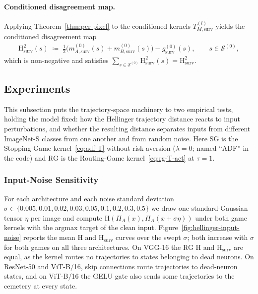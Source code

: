 \documentclass[twoside]{article}
\newcommand{\1}{\mathbf{1}}
\begin{document}
\paragraph{Conditioned disagreement map.}
Applying Theorem~\ref{thm:per-pixel} to the conditioned kernels $T_{M,\mathrm{surv}}^{(l)}$ yields
the conditioned disagreement map
\begin{align}\label{eq:conditioned-per-pixel-h2}
    \mathrm{H}_{\mathrm{surv}}^2(s)
    \;\coloneqq\;
    \tfrac{1}{2}\bigl(m_{A,\mathrm{surv}}^{(0)}(s) + m_{B,\mathrm{surv}}^{(0)}(s)\bigr)
    -
    g_{\mathrm{surv}}^{(0)}(s),
    \qquad s \in \mathcal{S}^{(0)},
\end{align}
which is non-negative and satisfies $\sum_{s \in \mathcal{S}^{(0)}} \mathrm{H}_{\mathrm{surv}}^2(s)
    = \mathrm{H}_{\mathrm{surv}}^2$.

\subsection{Experiments}\label{sec:lmp-experiments}

This subsection puts the trajectory-space machinery to two empirical tests, holding the model
fixed: how the Hellinger trajectory distance reacts to input perturbations, and whether the
resulting distance separates inputs from different ImageNet-S classes from one another and from
random noise. Here \ac{SG} is the Stopping-Game kernel~\eqref{eq:adf-T} without risk aversion
($\lambda = 0$; named ``ADF'' in the code) and \ac{RG} is the Routing-Game
kernel~\eqref{eq:rg-T-act} at $\tau = 1$.

\subsubsection{Input-Noise Sensitivity}\label{sec:input-noise-hellinger}

For each architecture and each noise standard deviation $\sigma \in \{0.005, 0.01, 0.02, 0.03,
    0.05, 0.1, 0.2, 0.3, 0.5\}$ we draw one standard-Gaussian tensor $\eta$ per image and compute
$\mathrm{H}(\Pi_A(x), \Pi_A(x + \sigma\eta))$ under both game kernels with the argmax target of the
clean input. Figure~\ref{fig:hellinger-input-noise} reports the mean $\mathrm{H}$ and
$\mathrm{H}_{\mathrm{surv}}$ curves over the swept $\sigma$; both increase with $\sigma$ for both
games on all three architectures. On VGG-16 the \ac{RG} $\mathrm{H}$ and
$\mathrm{H}_{\mathrm{surv}}$ are equal, as the kernel routes no trajectories to states belonging to
dead neurons. On ResNet-50 and ViT-B/16, skip connections route trajectories to dead-neuron states,
and on ViT-B/16 the GELU gate also sends some trajectories to the cemetery at every state.
\end{document}
